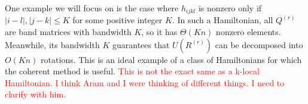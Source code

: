 One example we will focus on is the case where $h_{ijkl}$ is nonzero only if $|i - l|, |j - k| \leq K$ for some positive integer $K$. In such a Hamiltonian, all $Q^{(r)}$ are band matrices with bandwidth $K$, so it has $\Theta(Kn)$ nonzero elements. Meanwhile, its bandwidth $K$ guarantees that $U(R^{(r)})$ can be decomposed into $O(Kn)$ rotations. This is an ideal example of a class of Hamiltonians for which the coherent method is useful.
\textcolor{red}{This is not the exact same as a k-local Hamiltonian. I think Aram and I were thinking of different things. I need to clarify with him.}





